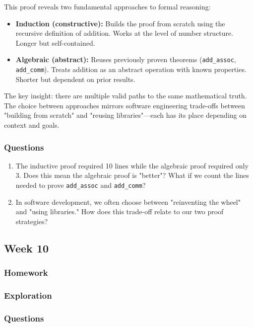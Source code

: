 \documentclass{article}
\theoremstyle{theorem}
\theoremstyle{definition}
\theoremstyle{remark}
\begin{document}
This proof reveals two fundamental approaches to formal reasoning:

\begin{itemize}
\item \textbf{Induction (constructive):} Builds the proof from scratch using the recursive definition of addition. Works at the level of number structure. Longer but self-contained.

\item \textbf{Algebraic (abstract):} Reuses previously proven theorems (\texttt{add\_assoc}, \texttt{add\_comm}). Treats addition as an abstract operation with known properties. Shorter but dependent on prior results.
\end{itemize}

The key insight: there are multiple valid paths to the same mathematical truth. The choice between approaches mirrors software engineering trade-offs between "building from scratch" and "reusing libraries"—each has its place depending on context and goals.

\subsubsection{Questions}

\begin{enumerate}
\item The inductive proof required 10 lines while the algebraic proof required only 3. Does this mean the algebraic proof is "better"? What if we count the lines needed to prove \texttt{add\_assoc} and \texttt{add\_comm}?

\item In software development, we often choose between "reinventing the wheel" and "using libraries." How does this trade-off relate to our two proof strategies?
\end{enumerate}

\subsection{Week 10}
\subsubsection{Homework}
\subsubsection{Exploration}
\subsubsection{Questions}
\end{document}
